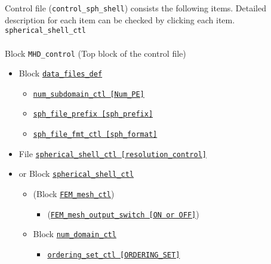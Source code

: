 \label{section:control_sph_shell}
Control file ({\tt control\_sph\_shell}) consists the following items. Detailed description for each item can be checked by clicking each item.
\\
%
\verb|spherical_shell_ctl|
\label{href_i:spherical_shell_ctl}
\\
\\
%
Block {\tt MHD\_control} (Top block of the control file)
	\begin{itemize}
	\item Block \hyperref[href_t:data_files_def]{\tt data\_files\_def}
%
		\begin{itemize} \label{href_i:data_files_def2}
		\item \hyperref[href_t:num_subdomain_ctl]{\tt num\_subdomain\_ctl    [Num\_PE]}
		\item \hyperref[href_t:sph_file_prefix]{\tt sph\_file\_prefix    [sph\_prefix]}
		\item \hyperref[href_t:sph_file_fmt_ctl]{\tt sph\_file\_fmt\_ctl    [sph\_format]}
		\end{itemize}
%
	\item File \hyperref[href_t:spherical_shell_ctl]{\tt spherical\_shell\_ctl    [resolution\_control]}
	\item or Block \hyperref[href_t:spherical_shell_ctl]{\tt spherical\_shell\_ctl}
%
		\begin{itemize}
		\item (Block \hyperref[href_t:FEM_mesh_ctl]{\tt FEM\_mesh\_ctl})
		\begin{itemize} \label{href_i:FEM_mesh_ctl}
		\item (\hyperref[href_t:FEM_mesh_output_switch]{\tt FEM\_mesh\_output\_switch [ON or OFF]})
		\end{itemize}
%
		\item Block \hyperref[href_t:num_domain_ctl]{\tt num\_domain\_ctl}
			\begin{itemize} \label{href_i:num_domain_ctl}
			\item \hyperref[href_t:ordering_set_ctl]{\tt ordering\_set\_ctl [ORDERING\_SET]}


\end{itemize}
\end{itemize}
\end{itemize}
